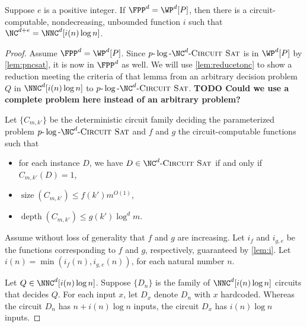 \documentclass{article}
\newcommand{\todo}[1]{\textbf{TODO #1}}
\newcommand{\dash}{\textnormal{-}}
\newcommand{\pncsat}{p\dash\log\dash\NC^d\dash\textsc{Circuit Sat}}
\DeclareMathOperator{\depth}{depth}
\DeclareMathOperator{\size}{size}
\begin{document}
\begin{theorem}\label{thm:wpppartii}
  Suppose $e$ is a positive integer.
  If $\FPP^d = \WP^d[P]$, then there is a circuit-computable, nondecreasing, unbounded function $i$ such that $\NC^{d + e} = \NNC^d[i(n) \log n]$.
\end{theorem}
\begin{proof}
  Assume $\FPP^d = \WP^d[P]$.
  Since $\pncsat$ is in $\WP^d[P]$ by \autoref{lem:pncsat}, it is now in $\FPP^d$ as well.
  We will use \autoref{lem:reducetonc} to show a reduction meeting the criteria of that lemma from an arbitrary decision problem $Q$ in $\NNC^d[i(n) \log n]$ to $\pncsat$.
  \todo{Could we use a complete problem here instead of an arbitrary problem?}

  Let $\{C_{m, k'}\}$ be the deterministic circuit family deciding the parameterized problem $\pncsat$ and $f$ and $g$ the circuit-computable functions such that
  \begin{itemize}
  \item for each instance $D$, we have $D \in \NC^d\textnormal{-}\textsc{Circuit Sat}$ if and only if $C_{m, k'}(D) = 1$,
  \item $\size(C_{m, k'}) \leq f(k') m^{O(1)}$,
  \item $\depth(C_{m, k'}) \leq g(k') \log^d m$.
  \end{itemize}
  Assume without loss of generality that $f$ and $g$ are increasing.
  Let $i_f$ and $i_{g, e}$ be the functions corresponding to $f$ and $g$, respectively, guaranteed by \autoref{lem:i}.
  Let $i(n) = \min(i_f(n), i_{g, e}(n))$, for each natural number $n$.

  Let $Q \in \NNC^d[i(n) \log n]$.
  Suppose $\{D_n\}$ is the family of $\NNC^d[i(n) \log n]$ circuits that decides $Q$.
  For each input $x$, let $D_x$ denote $D_n$ with $x$ hardcoded.
  Whereas the circuit $D_n$ has $n + i(n) \log n$ inputs, the circuit $D_x$ has $i(n) \log n$ inputs.


\end{proof}
\end{document}
